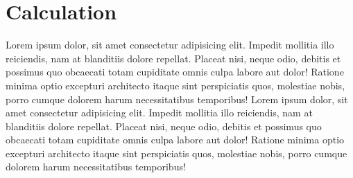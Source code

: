 \section{Calculation}
	Lorem ipsum dolor, sit amet consectetur adipisicing elit. Impedit mollitia illo reiciendis, nam at blanditiis dolore repellat. Placeat nisi, neque odio, debitis et possimus quo obcaecati totam cupiditate omnis culpa labore aut dolor! Ratione minima optio excepturi architecto itaque sint perspiciatis quos, molestiae nobis, porro cumque dolorem harum necessitatibus temporibus! Lorem ipsum dolor, sit amet consectetur adipisicing elit. Impedit mollitia illo reiciendis, nam at blanditiis dolore repellat. Placeat nisi, neque odio, debitis et possimus quo obcaecati totam cupiditate omnis culpa labore aut dolor! Ratione minima optio excepturi architecto itaque sint perspiciatis quos, molestiae nobis, porro cumque dolorem harum necessitatibus temporibus!
